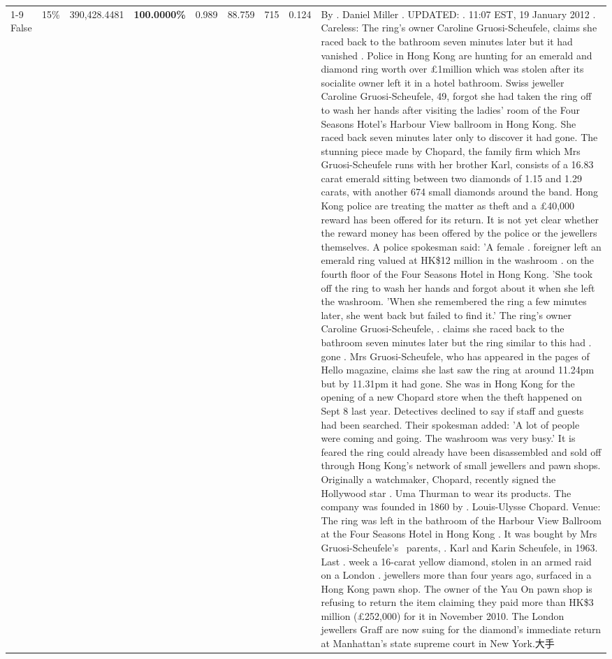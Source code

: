 \begin{table}[H]
\begin{tabular}{lllrlllll}
\cline{1-9} \cline{2-9}
False & 15\% & 390,428.4481 & \bfseries \color{red} 100.0000\% & 0.989 & 88.759 & 715 & 0.124 & By . Daniel Miller . UPDATED: . 11:07 EST, 19 January 2012 . Careless: The ring's owner Caroline Gruosi-Scheufele, claims she raced back to the bathroom seven minutes later but it had vanished . Police in Hong Kong are hunting for an emerald and diamond ring worth over £1million which was stolen after its socialite owner left it in a hotel bathroom. Swiss jeweller Caroline Gruosi-Scheufele, 49, forgot she had taken the ring off to wash her hands after visiting the ladies' room of the Four Seasons Hotel's Harbour View ballroom in Hong Kong. She raced back seven minutes later only to discover it had gone. The stunning piece made by Chopard, the family firm which Mrs Gruosi-Scheufele runs with her brother Karl, consists of a 16.83 carat emerald sitting between two diamonds of 1.15 and 1.29 carats, with another 674 small diamonds around the band. Hong Kong police are treating the matter as theft and a £40,000 reward has been offered for its return. It is not yet clear whether the reward money has been offered by the police or the jewellers themselves. A police spokesman said: 'A female . foreigner left an emerald ring valued at HK\$12 million in the washroom . on the fourth floor of the Four Seasons Hotel in Hong Kong. 'She took off the ring to wash her hands and forgot about it when she left the washroom. 'When she remembered the ring a few minutes later, she went back but failed to find it.' The ring's owner Caroline Gruosi-Scheufele, . claims she raced back to the bathroom seven minutes later but the ring similar to this had . gone . Mrs Gruosi-Scheufele, who has appeared in the pages of Hello magazine, claims she last saw the ring at around 11.24pm but by 11.31pm it had gone. She was in Hong Kong for the opening of a new Chopard store when the theft happened on Sept 8 last year. Detectives declined to say if staff and guests had been searched. Their spokesman added: 'A lot of people were coming and going. The washroom was very busy.' It is feared the ring could already have been disassembled and sold off through Hong Kong's network of small jewellers and pawn shops. Originally a watchmaker, Chopard, recently signed the Hollywood star . Uma Thurman to wear its products. The company was founded in 1860 by . Louis-Ulysse Chopard. Venue: The ring was left in the bathroom of the Harbour View Ballroom at the Four Seasons Hotel in Hong Kong . It was bought by Mrs Gruosi-Scheufele's  parents, . Karl and Karin Scheufele, in 1963. Last . week a 16-carat yellow diamond, stolen in an armed raid on a London . jewellers more than four years ago, surfaced in a Hong Kong pawn shop. The owner of the Yau On pawn shop is refusing to return the item claiming they paid more than HK\$3 million (£252,000) for it in November 2010. The London jewellers Graff are now suing for the diamond’s immediate return at Manhattan’s state supreme court in New York.大手 \\

\end{tabular}
\end{table}
